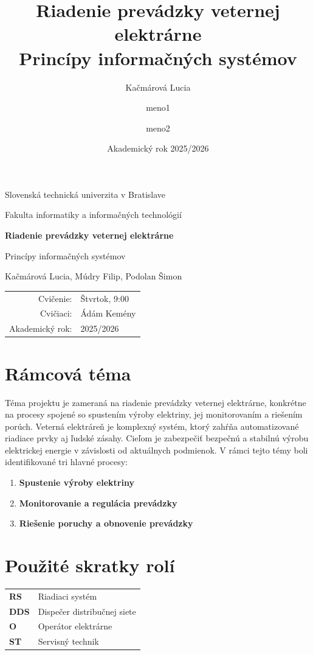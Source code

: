 \documentclass[12pt,a4paper]{article}
\title{Riadenie prevádzky veternej elektrárne\\Princípy informačných systémov}
\author{Kačmárová Lucia \and meno1 \and meno2}
\date{Akademický rok 2025/2026}
\begin{document}
\hypersetup{pageanchor=false}
\begin{titlepage}
  \centering
  {\Large Slovenská technická univerzita v Bratislave\par}
  {\Large Fakulta informatiky a informačných technológií\par}
  \vspace{3cm}
  {\huge\bfseries Riadenie prevádzky veternej elektrárne\par}
  \vspace{0.5cm}
  {\Large Princípy informačných systémov\par}
  \vspace{2.5cm}

  {\large Kačmárová Lucia, Múdry Filip, Podolan Šimon\par}
  \vfill

  \begin{tabular}{rl}
    Cvičenie: & Štvrtok, 9:00 \\
    Cvičiaci: & Ádám Kemény \\
    Akademický rok: & 2025/2026 \\
  \end{tabular}
\end{titlepage}
\hypersetup{pageanchor=true}

\tableofcontents
\newpage

\section{Rámcová téma}
Téma projektu je zameraná na riadenie prevádzky veternej elektrárne, konkrétne na procesy spojené so spustením výroby elektriny, jej monitorovaním a riešením porúch. Veterná elektráreň je komplexný systém, ktorý zahŕňa automatizované riadiace prvky aj ľudské zásahy. Cieľom je zabezpečiť bezpečnú a stabilnú výrobu elektrickej energie v závislosti od aktuálnych podmienok. V rámci tejto témy boli identifikované tri hlavné procesy:

\begin{enumerate}
  \item \textbf{Spustenie výroby elektriny}
  \item \textbf{Monitorovanie a regulácia prevádzky}
  \item \textbf{Riešenie poruchy a obnovenie prevádzky}
\end{enumerate}


\section*{Použité skratky rolí}
\noindent
\begin{tabular}{@{}>{\bfseries}l p{}}
RS   & Riadiaci systém  \\
DDS & Dispečer distribučnej siete \\
O  & Operátor elektrárne \\
ST  & Servisný technik \\
\end{tabular}
\end{document}

